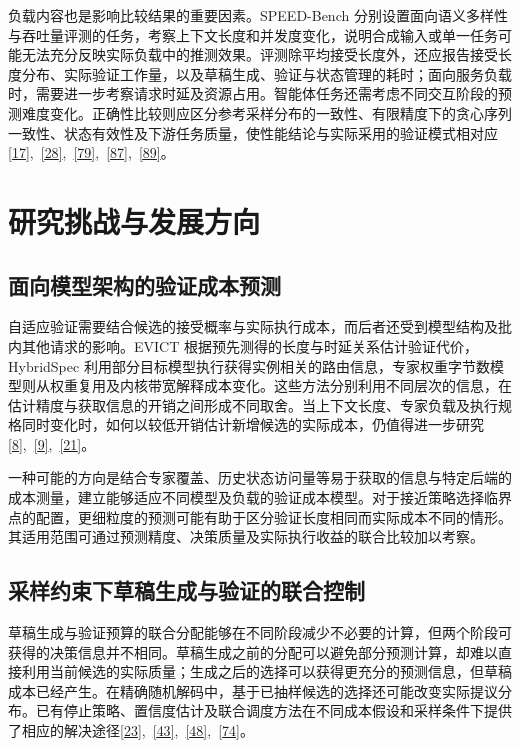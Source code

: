 \documentclass[11pt,a4paper,UTF8,fontset=none,scheme=plain,zihao=-4]{ctexart}
\begin{document}
负载内容也是影响比较结果的重要因素。SPEED-Bench
分别设置面向语义多样性与吞吐量评测的任务，考察上下文长度和并发度变化，说明合成输入或单一任务可能无法充分反映实际负载中的推测效果。评测除平均接受长度外，还应报告接受长度分布、实际验证工作量，以及草稿生成、验证与状态管理的耗时；面向服务负载时，需要进一步考察请求时延及资源占用。智能体任务还需考虑不同交互阶段的预测难度变化。正确性比较则应区分参考采样分布的一致性、有限精度下的贪心序列一致性、状态有效性及下游任务质量，使性能结论与实际采用的验证模式相对应\protect\hyperlink{ref-twig}{{[}17{]}},~\protect\hyperlink{ref-dlite}{{[}28{]}},~\protect\hyperlink{ref-sglppcommit}{{[}79{]}},~\protect\hyperlink{ref-illusion}{{[}87{]}},~\protect\hyperlink{ref-speedbench}{{[}89{]}}。

\hypertarget{section-8}{%
\section{研究挑战与发展方向}\label{section-8}}

\hypertarget{section-8-1}{%
\subsection{面向模型架构的验证成本预测}\label{section-8-1}}

自适应验证需要结合候选的接受概率与实际执行成本，而后者还受到模型结构及批内其他请求的影响。EVICT
根据预先测得的长度与时延关系估计验证代价，HybridSpec
利用部分目标模型执行获得实例相关的路由信息，专家权重字节数模型则从权重复用及内核带宽解释成本变化。这些方法分别利用不同层次的信息，在估计精度与获取信息的开销之间形成不同取舍。当上下文长度、专家负载及执行规格同时变化时，如何以较低开销估计新增候选的实际成本，仍值得进一步研究\protect\hyperlink{ref-evict}{{[}8{]}},~\protect\hyperlink{ref-hybridspec}{{[}9{]}},~\protect\hyperlink{ref-moebytes}{{[}21{]}}。

一种可能的方向是结合专家覆盖、历史状态访问量等易于获取的信息与特定后端的成本测量，建立能够适应不同模型及负载的验证成本模型。对于接近策略选择临界点的配置，更细粒度的预测可能有助于区分验证长度相同而实际成本不同的情形。其适用范围可通过预测精度、决策质量及实际执行收益的联合比较加以考察。

\hypertarget{section-8-2}{%
\subsection{采样约束下草稿生成与验证的联合控制}\label{section-8-2}}

草稿生成与验证预算的联合分配能够在不同阶段减少不必要的计算，但两个阶段可获得的决策信息并不相同。草稿生成之前的分配可以避免部分预测计算，却难以直接利用当前候选的实际质量；生成之后的选择可以获得更充分的预测信息，但草稿成本已经产生。在精确随机解码中，基于已抽样候选的选择还可能改变实际提议分布。已有停止策略、置信度估计及联合调度方法在不同成本假设和采样条件下提供了相应的解决途径\protect\hyperlink{ref-dspark}{{[}23{]}},~\protect\hyperlink{ref-specdecpp}{{[}43{]}},~\protect\hyperlink{ref-forespark}{{[}48{]}},~\protect\hyperlink{ref-vllmavestimator}{{[}74{]}}。
\end{document}
